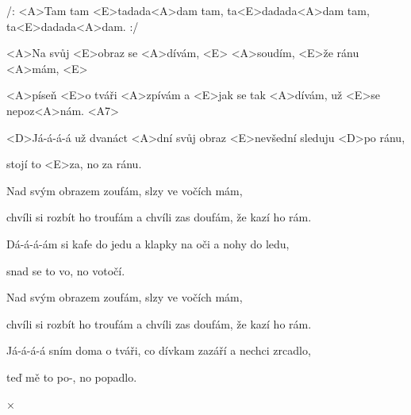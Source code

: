 

\zr
/: <A>Tam tam <E>tadada<A>dam tam, ta<E>dadada<A>dam tam, ta<E>dadada<A>dam. :/
\kr

\zs
<A>Na svůj <E>obraz se <A>dívám, <E> <A>soudím, <E>že ránu <A>mám, <E>

<A>píseň <E>o tváři <A>zpívám a <E>jak se tak <A>dívám, už <E>se nepoz<A>nám. <A7>

<D>Já-á-á-á už dvanáct <A>dní svůj obraz <E>nevšední sleduju <D>po ránu,

stojí to <E>za, no za ránu.
\ks

\zr\kr

\zs
Nad svým obrazem zoufám, slzy ve vočích mám,

chvíli si rozbít ho troufám a chvíli zas doufám, že kazí ho rám.

Dá-á-á-ám si kafe do jedu a klapky na oči a nohy do ledu,

snad se to vo, no votočí.
\ks

\zr\kr

\zs
Nad svým obrazem zoufám, slzy ve vočích mám,

chvíli si rozbít ho troufám a chvíli zas doufám, že kazí ho rám.

Já-á-á-á sním doma o tváři, co dívkam zazáří a nechci zrcadlo,

teď mě to po-, no popadlo.
\ks

× \kr

\kp
